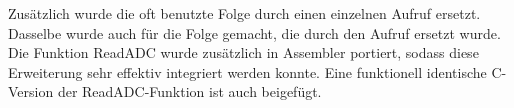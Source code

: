 Zusätzlich wurde die oft benutzte Folge  durch einen einzelnen Aufruf
 ersetzt.
Dasselbe wurde auch für die Folge  gemacht, die durch den Aufruf
 ersetzt wurde.
Die Funktion ReadADC wurde zusätzlich in Assembler portiert, sodass diese Erweiterung
sehr effektiv integriert werden konnte.
Eine funktionell identische C-Version der ReadADC-Funktion ist auch beigefügt.
